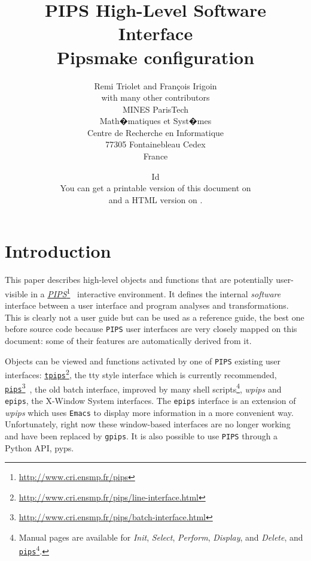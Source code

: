 \documentclass[a4paper]{report}
\title{PIPS High-Level Software Interface \\
    Pipsmake configuration}
\author{Remi Triolet and Fran\c{c}ois Irigoin\\
  with many other contributors\\
        MINES ParisTech \\
        Math�matiques et Syst�mes \\
        Centre de Recherche en Informatique \\
        77305 Fontainebleau Cedex \\
        France \\}
\date{
  $~$Id$~$\\[3cm]
  You can get a printable version of this document on\\
  \PipsPIPSmakePDF and a HTML version on \PipsPIPSmakeHTDOC.
}
\newenvironment{PipsExample}{\VerbatimEnvironment
\begin{Verbatim}}{\end{Verbatim}}
\newcommand{\LINK}[2]{\href{#2}{#1}\footnote{\url{#2}}\xspace}
\newcommand{\Pips}{\texttt{PIPS}}
\newcommand{\PIPS}{\LINK{\emph{PIPS}}{http://www.cri.ensmp.fr/pips}}
\newcommand{\pips}{\LINK{\texttt{pips}}{http://www.cri.ensmp.fr/pips/batch-interface.html}}
\newcommand{\TPIPS}{\LINK{\texttt{tpips}}{http://www.cri.ensmp.fr/pips/line-interface.html}}
\newcommand{\WPIPS}{{\em wpips}}
\newcommand{\Init}{{\em Init}}
\newcommand{\Select}{{\em Select}}
\newcommand{\Perform}{{\em Perform}}
\newcommand{\Display}{{\em Display}}
\newcommand{\Delete}{{\em Delete}}
\begin{document}
\thispagestyle{empty}

\maketitle



\newenvironment{PipsMenu}[1]{\par{\bf #1}\\\begin{alltt}}{\end{alltt}}



\chapter{Introduction}

This paper describes high-level objects and functions that are
potentially user-visible in a \PIPS{}~\cite{IJT91} interactive
environment.  It defines the internal {\em software} interface between
a user interface and program analyses and transformations. This is
clearly not a user guide but can be used as a reference guide, the
best one before source code because {\tt PIPS} user interfaces are very
closely mapped on this document: some of their features are
automatically derived from it.

Objects can be viewed and functions activated by one of \Pips{}
existing user interfaces: \TPIPS{}, the tty style interface which is
currently recommended, \pips{}~\cite{BIJ91}, the old batch
interface, improved by many shell scripts\footnote{Manual pages are
  available for \Init{}, \Select{}, \Perform{}, \Display{}, and
  \Delete{}, and \pips{}.}, \WPIPS{} and {\tt epips}, the X-Window
System interfaces.  The {\tt epips} interface is an extension of
\WPIPS{} which uses {\tt Emacs} to display more information in a more
convenient way. Unfortunately, right now these window-based interfaces
are no longer working and have been replaced by {\tt gpips}. It is
also possible to use \Pips{} through a Python API, pyps.
\end{document}
